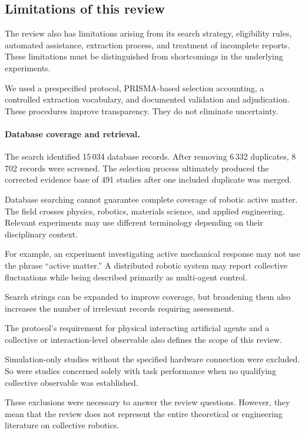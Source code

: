 \subsection{Limitations of this review}
\label{sec:discussion-review-limitations}

The review also has limitations arising from its
search strategy, eligibility rules, automated
assistance, extraction process, and treatment
of incomplete reports. These limitations
must be distinguished from shortcomings
in the underlying experiments.

We used a prespecified protocol,
PRISMA-based selection accounting,
a controlled extraction vocabulary,
and documented validation and
adjudication. These procedures
improve transparency.
They do not eliminate uncertainty.

\paragraph*{Database coverage and retrieval.}

The search identified 15\,034 database records.
After removing 6\,332 duplicates,
8\,702 records were screened.
The selection process ultimately
produced the corrected evidence
base of 491 studies after
one included duplicate
was merged.

Database searching cannot guarantee
complete coverage of robotic
active matter.
The field crosses
physics, robotics,
materials science,
and applied engineering.
Relevant experiments
may use different
terminology depending
on their disciplinary context.

For example, an experiment
investigating active
mechanical response
may not use the
phrase ``active matter.''
A distributed robotic
system may report
collective fluctuations
while being described
primarily as
multi-agent control.

Search strings can be
expanded to improve
coverage, but broadening
them also increases
the number of irrelevant
records requiring
assessment.

The protocol's requirement
for physical interacting
artificial agents and
a collective or
interaction-level
observable also defines
the scope of this review.

Simulation-only studies
without the specified
hardware connection
were excluded.
So were studies
concerned solely
with task performance
when no qualifying
collective observable
was established.

These exclusions were
necessary to answer
the review questions.
However, they mean
that the review
does not represent
the entire theoretical
or engineering
literature on
collective robotics.

